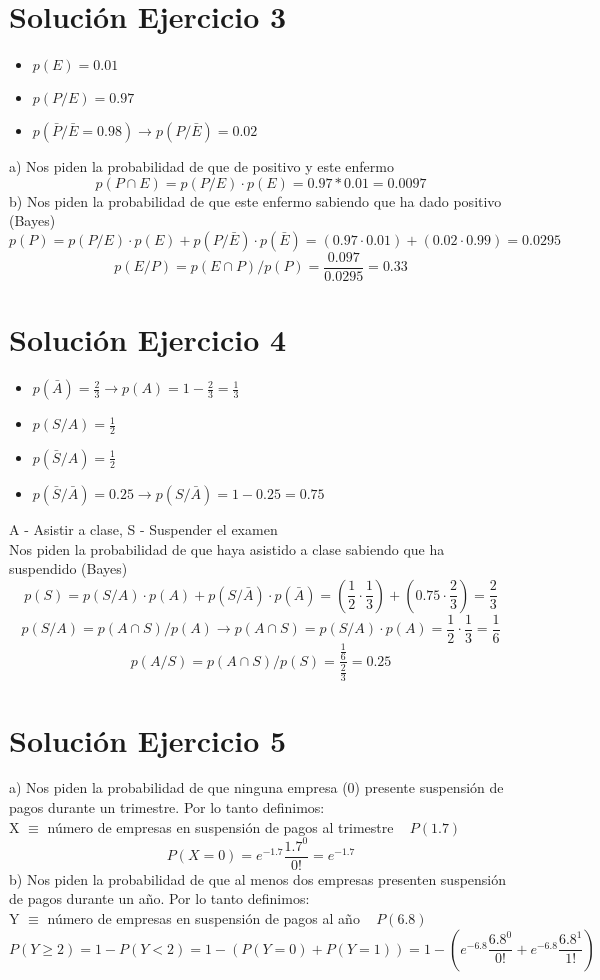 \documentclass[fleqn]{article}
\begin{document}
	\section{Solución Ejercicio 3}
	\begin{itemize}
		\item $p(E) = 0.01$
		\item $p(P/E) = 0.97$
		\item $p(\bar{P}/\bar{E} = 0.98) \rightarrow p(P/\bar{E}) = 0.02$ 
	\end{itemize}
	a) Nos piden la probabilidad de que de positivo y este enfermo
	\[
	p(P \cap E) = p(P/E) \cdot p(E) = 0.97 * 0.01 = \boxed{0.0097}
	\]
	b) Nos piden la probabilidad de que este enfermo sabiendo que ha dado positivo (Bayes)
	\[
	p(P) = p(P/E) \cdot p(E) + p(P/\bar{E}) \cdot p(\bar{E}) = (0.97 \cdot 0.01) + (0.02 \cdot 0.99) = 0.0295
	\]
	\[
	p(E/P) = p(E \cap P)/p(P) = \frac{0.097}{0.0295} = \boxed{0.33}
	\]
	\section{Solución Ejercicio 4}
	\begin{itemize}
		\item $p(\bar{A}) = \frac{2}{3} \rightarrow p(A) = 1 - \frac{2}{3} = \frac{1}{3}$
		\item $p(S/A) = \frac{1}{2}$
		\item $p(\bar{S}/A) = \frac{1}{2}$
		\item $p(\bar{S}/\bar{A}) = 0.25 \rightarrow p(S/\bar{A}) = 1 - 0.25 = 0.75$
	\end{itemize}
	A - Asistir a clase, S - Suspender el examen \\
	Nos piden la probabilidad de que haya asistido a clase sabiendo que ha suspendido (Bayes)
	\[
	p(S) = p(S/A) \cdot p(A) + p(S/\bar{A}) \cdot p(\bar{A}) = (\frac{1}{2} \cdot \frac{1}{3}) + (0.75 \cdot \frac{2}{3}) = \frac{2}{3}
	\]
	\[
	p(S/A) = p(A \cap S) / p(A) \rightarrow p(A \cap S) = p(S/A) \cdot p(A) = \frac{1}{2} \cdot \frac{1}{3} = \frac{1}{6}
	\]
	\[
	p(A/S) = p(A \cap S) / p(S) = \frac{\frac{1}{6}}{\frac{2}{3}} = \boxed{0.25}
	\]
	\section{Solución Ejercicio 5}
	a) Nos piden la probabilidad de que ninguna empresa (0) presente suspensión de pagos durante un trimestre. Por lo tanto definimos: \\
	X $\equiv$ número de empresas en suspensión de pagos al trimestre ~ $P(1.7)$
	\[
	P(X=0) = e^{-1.7}\frac{1.7^{0}}{0!} = \boxed{e^{-1.7}}
	\]
	b) Nos piden la probabilidad de que al menos dos empresas presenten suspensión de pagos durante un año. Por lo tanto definimos: \\
	Y $\equiv$ número de empresas en suspensión de pagos al año ~ $P(6.8)$
	\[
	P(Y \geq 2) = 1 - P(Y < 2) = 1 - (P(Y = 0) + P(Y = 1)) = \boxed{1 - (e^{-6.8}\frac{6.8^{0}}{0!} + e^{-6.8}\frac{6.8^{1}}{1!})} 
	\]
\end{document}
